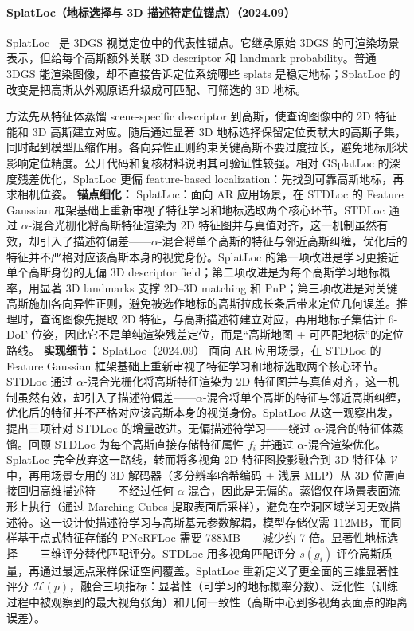 \paragraph{SplatLoc（地标选择与 3D 描述符定位锚点）（2024.09）}
SplatLoc~\cite{2409_14067} 是 3DGS 视觉定位中的代表性锚点。它继承原始 3DGS 的可渲染场景表示，但给每个高斯额外关联 3D descriptor 和 landmark probability。普通 3DGS 能渲染图像，却不直接告诉定位系统哪些 splats 是稳定地标；SplatLoc 的改变是把高斯从外观原语升级成可匹配、可筛选的 3D 地标。

方法先从特征体蒸馏 scene-specific descriptor 到高斯，使查询图像中的 2D 特征能和 3D 高斯建立对应。随后通过显著 3D 地标选择保留定位贡献大的高斯子集，同时起到模型压缩作用。各向异性正则约束关键高斯不要过度拉长，避免地标形状影响定位精度。公开代码和复核材料说明其可验证性较强。相对 GSplatLoc 的深度残差优化，SplatLoc 更偏 feature-based localization：先找到可靠高斯地标，再求相机位姿。
\textbf{锚点细化：} SplatLoc：面向 AR 应用场景，在 STDLoc 的 Feature Gaussian 框架基础上重新审视了特征学习和地标选取两个核心环节。STDLoc 通过 $\alpha$-混合光栅化将高斯特征渲染为 2D 特征图并与真值对齐，这一机制虽然有效，却引入了描述符偏差——$\alpha$-混合将单个高斯的特征与邻近高斯纠缠，优化后的特征并不严格对应该高斯本身的视觉身份。SplatLoc 的第一项改进是学习更接近单个高斯身份的无偏 3D descriptor field；第二项改进是为每个高斯学习地标概率，用显著 3D landmarks 支撑 2D--3D matching 和 PnP；第三项改进是对关键高斯施加各向异性正则，避免被选作地标的高斯拉成长条后带来定位几何误差。推理时，查询图像先提取 2D 特征，与高斯描述符建立对应，再用地标子集估计 6-DoF 位姿，因此它不是单纯渲染残差定位，而是“高斯地图 + 可匹配地标”的定位路线。
\textbf{实现细节：} SplatLoc（2024.09） 面向 AR 应用场景，在 STDLoc 的 Feature Gaussian 框架基础上重新审视了特征学习和地标选取两个核心环节。STDLoc 通过 $\alpha$-混合光栅化将高斯特征渲染为 2D 特征图并与真值对齐，这一机制虽然有效，却引入了描述符偏差——$\alpha$-混合将单个高斯的特征与邻近高斯纠缠，优化后的特征并不严格对应该高斯本身的视觉身份。SplatLoc 从这一观察出发，提出三项针对 STDLoc 的增量改进。无偏描述符学习——绕过 $\alpha$-混合的特征体蒸馏。回顾 STDLoc 为每个高斯直接存储特征属性 $f_i$ 并通过 $\alpha$-混合渲染优化。SplatLoc 完全放弃这一路线，转而将多视角 2D 特征图投影融合到 3D 特征体 $\mathcal{V}$ 中，再用场景专用的 3D 解码器（多分辨率哈希编码 + 浅层 MLP）从 3D 位置直接回归高维描述符——不经过任何 $\alpha$-混合，因此是无偏的。蒸馏仅在场景表面流形上执行（通过 Marching Cubes 提取表面后采样），避免在空洞区域学习无效描述符。这一设计使描述符学习与高斯基元参数解耦，模型存储仅需 112MB，而同样基于点式特征存储的 PNeRFLoc 需要 788MB——减少约 7 倍。显著性地标选择——三维评分替代匹配评分。STDLoc 用多视角匹配评分 $s(g_i)$ 评价高斯质量，再通过最远点采样保证空间覆盖。SplatLoc 重新定义了更全面的三维显著性评分 $\mathcal{H}(p)$，融合三项指标：显著性（可学习的地标概率分数）、泛化性（训练过程中被观察到的最大视角张角）和几何一致性（高斯中心到多视角表面点的距离误差）。
